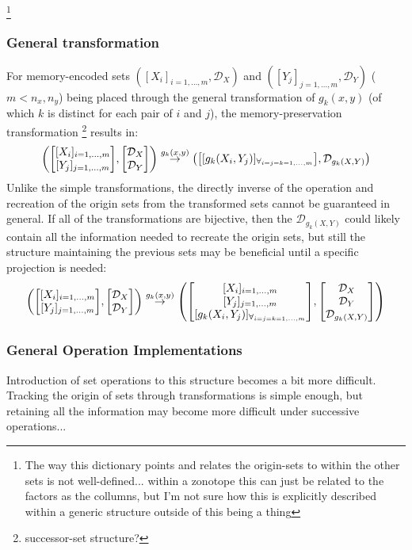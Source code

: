 \documentclass[11pt]{article}
\newcommand{\Dict}{\mathcal{D}} %
\begin{document}
\footnote{
	The way this dictionary points and relates the origin-sets to within the other sets is not well-defined...
	within a zonotope this can just be related to the factors as the collumns, but I'm not sure how this is explicitly described within a generic structure outside of this being a thing
}

\subsubsection{General transformation}
For memory-encoded sets $([X_{i}]_{i=1,\dots,m}, \Dict_{X})$ and $([Y_{j}]_{j=1,\dots,m}, \Dict_{Y})$ ($m < n_x,n_y$) being placed through the general transformation of $g_{k}(x,y)$ (of which $k$ is distinct for each pair of $i$ and $j$), the memory-preservation transformation \footnote{successor-set structure?} results in:
\[
	\qty(
		\mqty[
			[X_{i}]_{i=1,\dots,m}\\
			[Y_{j}]_{j=1,\dots,m}
		],
		\mqty[\Dict_{X}\\ \Dict_{Y}]
	)
	\overset{g_k(x,y)}{\to}
	\qty(
		\mqty[[g_k(X_{i},Y_{j})]_{\forall_{i=j=k=1,\dots,m}}],
		\Dict_{g_k(X,Y)}
	)
\]
Unlike the simple transformations, the directly inverse of the operation and recreation of the origin sets from the transformed sets cannot be guaranteed in general.
If all of the transformations are bijective, then the $\Dict_{g_k(X,Y)}$ could likely contain all the information needed to recreate the origin sets, but still the structure maintaining the previous sets may be beneficial until a specific projection is needed:
\[
	\qty(
		\mqty[
			[X_{i}]_{i=1,\dots,m}\\
			[Y_{j}]_{j=1,\dots,m}
		],
		\mqty[\Dict_{X}\\ \Dict_{Y}]
	)
	\overset{g_k(x,y)}{\to}
	\qty(
		\mqty[
			[X_{i}]_{i=1,\dots,m}\\
			[Y_{j}]_{j=1,\dots,m}\\
			[g_k(X_{i},Y_{j})]_{\forall_{i=j=k=1,\dots,m}}
		],
		\mqty[
			\Dict_{X}\\ 
			\Dict_{Y}\\ 
			\Dict_{g_k(X,Y)}
		]
	)
\]

\subsubsection{General Operation Implementations}
Introduction of set operations to this structure becomes a bit more difficult.
Tracking the origin of sets through transformations is simple enough, but retaining all the information may become more difficult under successive operations...
\end{document}
